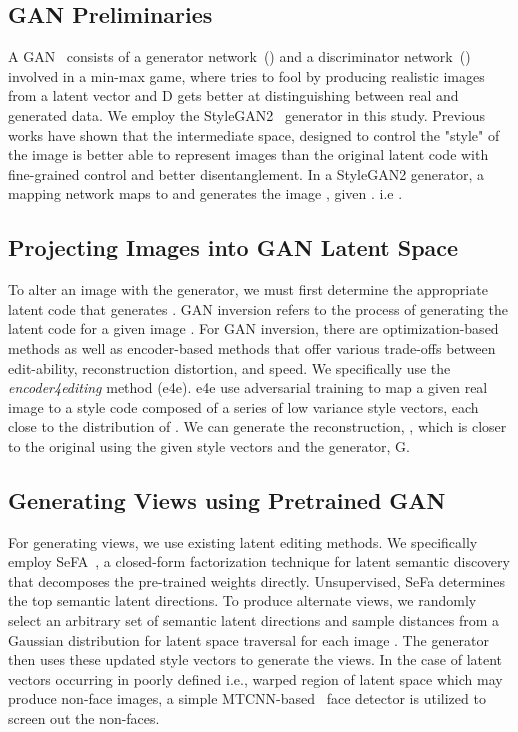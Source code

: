 \documentclass[runningheads]{llncs}
\begin{document}
\subsection{GAN Preliminaries}
A GAN~\cite{gan} consists of a generator network~() and a discriminator network~() involved in a min-max game, where  tries to fool  by producing realistic images from a latent vector  and D gets better at distinguishing between real and generated data. We employ the StyleGAN2~\cite{stylegan2} generator in this study. Previous works have shown that the intermediate  space, designed to control the "style" of the image is better able to represent images than the original latent code  with fine-grained control and better disentanglement. In a StyleGAN2 generator, a mapping network  maps  to  and  generates the image , given . i.e .

\subsection{Projecting Images into GAN Latent Space}
To alter an image  with the generator, we must first determine the appropriate latent code that generates . GAN inversion refers to the process of generating the latent code for a given image . For GAN inversion, there are optimization-based methods as well as encoder-based methods that offer various trade-offs between edit-ability, reconstruction distortion, and speed. We specifically use the \emph{encoder4editing} method (e4e)\cite{e4e}. e4e use adversarial training to map a given real image to a style code composed of a series of low variance style vectors, each close to the distribution of . We can generate the reconstruction, , which is closer to the original  using the given style vectors and the generator, G. 

\subsection{Generating Views using Pretrained GAN}
For generating views, we use existing latent editing methods. We specifically employ SeFA~\cite{sefa}, a closed-form factorization technique for latent semantic discovery that decomposes the pre-trained weights directly. Unsupervised, SeFa determines the top  semantic latent directions. To produce alternate views, we randomly select an arbitrary set of semantic latent directions and sample distances from a Gaussian distribution for latent space traversal for each image . The generator then uses these updated style vectors to generate the views. In the case of latent vectors occurring in poorly defined i.e., warped region of latent space which may produce non-face images, a simple MTCNN-based~\cite{mtcnn} face detector is utilized to screen out the non-faces.
\end{document}
